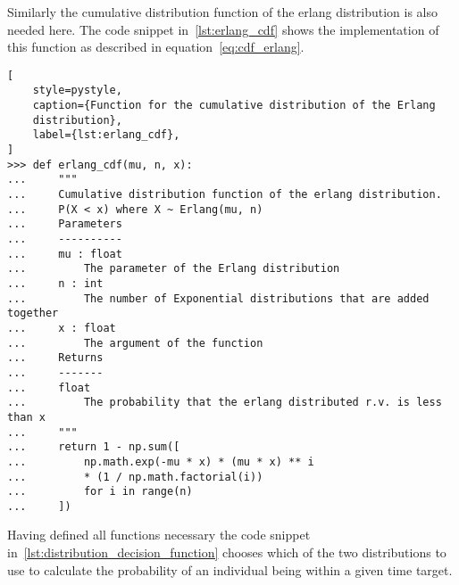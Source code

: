 Similarly the cumulative distribution function of the erlang distribution is
also needed here.
The code snippet in~\ref{lst:erlang_cdf} shows the implementation of this
function as described in equation~\eqref{eq:cdf_erlang}.

\begin{lstlisting}[
    style=pystyle,
    caption={Function for the cumulative distribution of the Erlang
    distribution},
    label={lst:erlang_cdf},
] 
>>> def erlang_cdf(mu, n, x):
...     """
...     Cumulative distribution function of the erlang distribution.
...     P(X < x) where X ~ Erlang(mu, n)
...     Parameters
...     ----------
...     mu : float
...         The parameter of the Erlang distribution
...     n : int
...         The number of Exponential distributions that are added together
...     x : float
...         The argument of the function
...     Returns
...     -------
...     float
...         The probability that the erlang distributed r.v. is less than x
...     """
...     return 1 - np.sum([
...         np.math.exp(-mu * x) * (mu * x) ** i
...         * (1 / np.math.factorial(i))
...         for i in range(n)
...     ])

\end{lstlisting}

Having defined all functions necessary the code snippet
in~\ref{lst:distribution_decision_function} chooses which of the two 
distributions to use to calculate the probability of an individual being within
a given time target.

